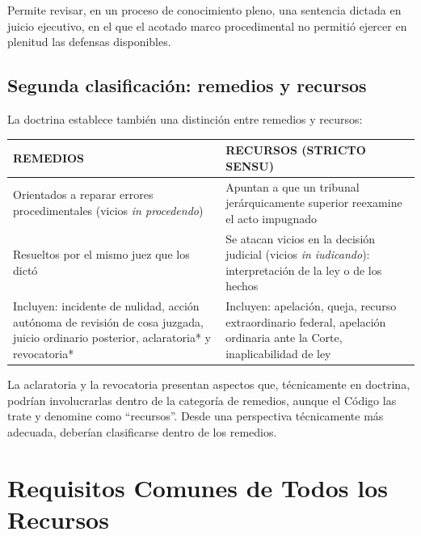 \documentclass[12pt,oneside]{book}
\begin{document}
Permite revisar, en un proceso de conocimiento pleno, una sentencia dictada en juicio ejecutivo, en el que el acotado marco procedimental no permitió ejercer en plenitud las defensas disponibles.

\section{Segunda clasificación: remedios y recursos}

La doctrina establece también una distinción entre remedios y recursos:

\begin{table}[H]
\centering
\begin{tabularx}{\textwidth}{
    >{\raggedright\arraybackslash}X
    >{\raggedright\arraybackslash}X
}
\toprule
\textbf{REMEDIOS} & \textbf{RECURSOS (STRICTO SENSU)} \\
\midrule
Orientados a reparar errores procedimentales (vicios \textit{in procedendo}) & Apuntan a que un tribunal jerárquicamente superior reexamine el acto impugnado \\
Resueltos por el mismo juez que los dictó & Se atacan vicios en la decisión judicial (vicios \textit{in iudicando}): interpretación de la ley o de los hechos \\
Incluyen: incidente de nulidad, acción autónoma de revisión de cosa juzgada, juicio ordinario posterior, aclaratoria* y revocatoria* & Incluyen: apelación, queja, recurso extraordinario federal, apelación ordinaria ante la Corte, inaplicabilidad de ley \\
\bottomrule
\end{tabularx}
\end{table}

\begin{note}
La aclaratoria y la revocatoria presentan aspectos que, técnicamente en doctrina, podrían involucrarlas dentro de la categoría de remedios, aunque el Código las trate y denomine como ``recursos''. Desde una perspectiva técnicamente más adecuada, deberían clasificarse dentro de los remedios.
\end{note}


\chapter{Requisitos Comunes de Todos los Recursos}
\end{document}
